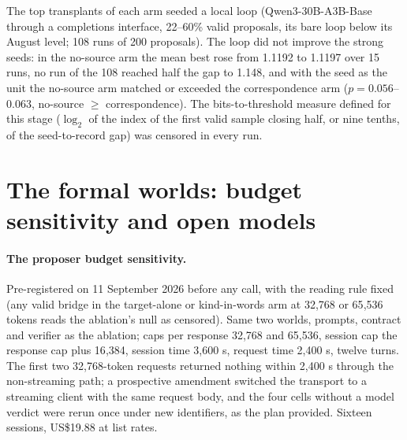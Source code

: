 \documentclass[11pt]{article}
\begin{document}
The top transplants of each arm seeded a local loop (Qwen3-30B-A3B-Base
through a completions interface, 22--60\% valid proposals, its bare loop
below its August level; 108 runs of 200 proposals). The loop did not
improve the strong seeds: in the no-source arm the mean best rose from
1.1192 to 1.1197 over 15 runs, no run of the 108 reached half the gap to
1.148, and with the seed as the unit the no-source arm matched or exceeded
the correspondence arm ($p=0.056$--$0.063$, no-source $\ge$
correspondence). The bits-to-threshold measure defined for this stage
($\log_2$ of the index of the first valid sample closing half, or nine
tenths, of the seed-to-record gap) was censored in every run.

\section{The formal worlds: budget sensitivity and open models}
\label{app:budget}

\paragraph{The proposer budget sensitivity.} Pre-registered on 11
September 2026 before any call, with the reading rule fixed (any valid
bridge in the target-alone or kind-in-words arm at 32{,}768 or 65{,}536
tokens reads the ablation's null as censored). Same two worlds, prompts,
contract and verifier as the ablation; caps per response 32{,}768 and
65{,}536, session cap the response cap plus 16{,}384, session time
3{,}600 s, request time 2{,}400 s, twelve turns. The first two
32{,}768-token requests returned nothing within 2{,}400 s through the
non-streaming path; a prospective amendment switched the transport to a
streaming client with the same request body, and the four cells without a
model verdict were rerun once under new identifiers, as the plan provided.
Sixteen sessions, US\$19.88 at list rates.
\end{document}
